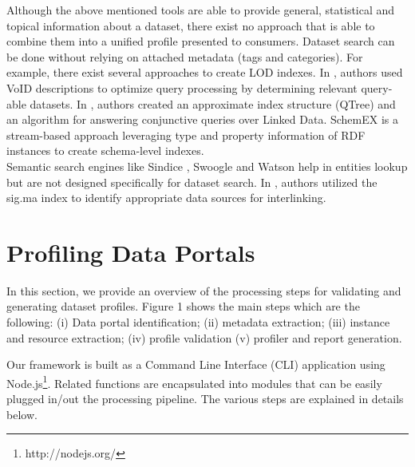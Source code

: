 \documentclass[runningheads,a4paper]{llncs}
\begin{document}
Although the above mentioned tools are able to provide general, statistical and topical information about a dataset, there exist no approach that is able to combine them into a unified profile presented to consumers. Dataset search can be done without relying on attached metadata (tags and categories). For example, there exist several approaches to create LOD indexes. In \cite{Alexander:LDOW09}, authors used VoID descriptions to optimize query processing by determining relevant query-able datasets. In \cite{Harth:2010:DSO:1772690.1772733}, authors created an approximate index structure (QTree) and an algorithm for answering conjunctive queries over Linked Data. SchemEX \cite{Konrath:2012:SEC:2399444.2399563} is a stream-based approach leveraging type and property information of RDF instances to create schema-level indexes.\\
Semantic search engines like Sindice \cite{Delbru2010a}, Swoogle \cite{Ding2004} and Watson \cite{d'Aquin:2011:WMS:2019470.2019476} help in entities lookup but are not designed specifically for dataset search. In \cite{whatShou]ldILinkTo}, authors utilized the sig.ma index \cite{Tummarello10sig.ma:live} to identify appropriate data sources for interlinking.


\section{Profiling Data Portals}
\label{sec:profiling data portals}

In this section, we provide an overview of the processing steps for validating and generating dataset profiles. Figure 1 shows the main steps which are the following: (i) Data portal identification; (ii) metadata extraction; (iii) instance and resource extraction; (iv) profile validation (v) profiler and report generation.

Our framework is built as a Command Line Interface (CLI) application using Node.js\footnote{http://nodejs.org/}. Related functions are encapsulated into modules that can be easily plugged in/out the processing pipeline. The various steps are explained in details below.
\end{document}
